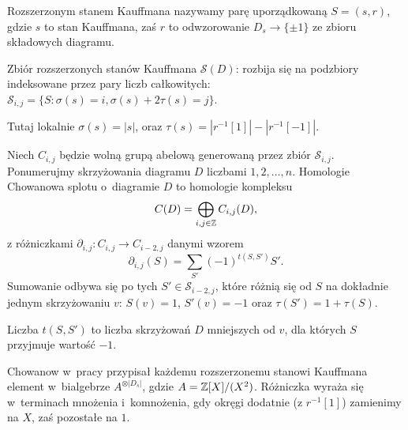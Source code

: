 \begin{definition}
    Rozszerzonym stanem Kauffmana nazywamy parę uporządkowaną $S = (s, r)$,
    gdzie $s$ to stan Kauffmana,
    zaś $r$ to odwzorowanie $D_s \to \{\pm 1\}$ ze zbioru składowych diagramu.
\end{definition}

\begin{definition}
    Zbiór rozszerzonych stanów Kauffmana $\mathcal S(D)$:
    rozbija się na podzbiory indeksowane przez pary liczb całkowitych:
    $\mathcal S_{i, j} = \{S : \sigma(s) = i, \sigma(s) + 2 \tau(s) = j\}$.
\end{definition}

Tutaj lokalnie $\sigma(s) = |s|$, oraz $\tau(s) = |r^{-1}[1]| - |r^{-1}[-1]|$.


\begin{definition}
    Niech $C_{i, j}$ będzie wolną grupą abelową generowaną przez zbiór $\mathcal S_{i, j}$.
    Ponumerujmy skrzyżowania diagramu $D$ liczbami $1, 2, \ldots, n$.
    Homologie Chowanowa splotu o~diagramie $D$ to homologie kompleksu
    \[
        C(D) = \bigoplus_{i, j \in \mathbb Z} C_{i, j}(D),
    \]
    z różniczkami $\partial_{i, j} \colon C_{i,j} \to C_{i-2, j}$ danymi wzorem
    \[
        \partial_{i, j}(S) = \sum_{S'} (-1)^{t(S, S')}  S'.
    \]
    Sumowanie odbywa się po tych $S' \in \mathcal S_{i-2, j}$,
    które różnią się od $S$ na dokładnie jednym skrzyżowaniu $v$:
    $S(v) = 1$, $S'(v) = -1$ oraz $\tau(S') = 1 + \tau (S)$.

    Liczba $t(S, S')$ to liczba skrzyżowań $D$ mniejszych od $v$, dla których $S$ przyjmuje wartość $-1$.
\end{definition}

Chowanow w~pracy \cite{khovanov00} przypisał każdemu rozszerzonemu stanowi Kauffmana
element w~bialgebrze $A^{\otimes |D_s|}$, gdzie $A = \mathbb Z[X]/(X^2)$.
Różniczka wyraża się w~terminach mnożenia i~komnożenia,
gdy okręgi dodatnie (z $r^{-1}[1]$) zamienimy na $X$, zaś pozostałe na $1$.


